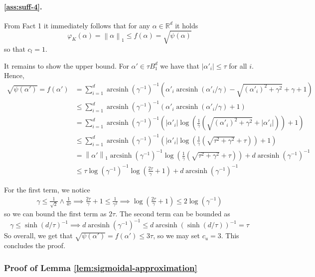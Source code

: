 \documentclass[a4paper]{article}
\newcommand{\pr}[1]{\left(#1\right)}
\newcommand{\abs}[1]{\left\lvert#1\right\rvert}
\newcommand{\norm}[1]{\left\|#1\right\|}
\newcommand{\RR}[0]{\mathbb{R}}
\DeclareMathOperator{\arcsinh}{arcsinh}
\theoremstyle{thmstyle}
\theoremstyle{defstyle}
\theoremstyle{remark}
\begin{document}
\paragraph{\ref{ass:suff-4}.}
From Fact 1 it immediately follows that for any $\alpha\in\RR^d$ it holds
\begin{equation*}
    \varphi_K(\alpha)=\norm{\alpha}_1 \leq f(\alpha)=\sqrt{\psi(\alpha)}
\end{equation*}
so that $c_l=1$.

It remains to show the upper bound. For $\alpha'\in \tau B_1^d$ we have that $\abs{\alpha'_i}\leq \tau$ for all $i$. Hence,
\begin{align*}
    \sqrt{\psi(\alpha')}=f(\alpha')&=\sum_{i=1}^d \arcsinh\pr{\gamma^{-1}}^{-1}\pr{ \alpha'_i\arcsinh\pr{\alpha'_i/\gamma}-\sqrt{(\alpha'_i)^2+\gamma^2}+\gamma+1} \\
    &\leq \sum_{i=1}^d \arcsinh\pr{\gamma^{-1}}^{-1}\pr{ \alpha'_i\arcsinh\pr{\alpha'_i/\gamma}+1}\\
    &=\sum_{i=1}^d \arcsinh\pr{\gamma^{-1}}^{-1}\pr{ \abs{\alpha'_i}\log\pr{\frac{1}{\gamma}\pr{\sqrt{(\alpha'_i)^2+\gamma^2}+\abs{\alpha'_i}}}+1} \\
    &\leq \sum_{i=1}^d \arcsinh\pr{\gamma^{-1}}^{-1}\pr{ \abs{\alpha'_i}\log\pr{\frac{1}{\gamma}\pr{\sqrt{\tau^2+\gamma^2}+\tau}}+1} \\
    &= \norm{\alpha'}_1 \arcsinh\pr{\gamma^{-1}}^{-1}\log\pr{\frac{1}{\gamma}\pr{\sqrt{\tau^2+\gamma^2}+\tau}}+d\arcsinh\pr{\gamma^{-1}}^{-1} \\
    &\leq \tau \log\pr{\gamma^{-1}}^{-1}\log\pr{\frac{2\tau}{\gamma}+1}+d\arcsinh\pr{\gamma^{-1}}^{-1}
\end{align*}

For the first term, we notice
\begin{align*}
    \gamma\leq \frac{1}{\sqrt{2}}\wedge\frac{1}{4\tau}\implies \frac{2\tau}{\gamma}+1\leq \frac{1}{\gamma^2} \implies \log\pr{\frac{2\tau}{\gamma}+1} \leq 2\log(\gamma^{-1})  
\end{align*}
so we can bound the first term as $2\tau$. The second term can be bounded as
\begin{equation*}
    \gamma \leq \sinh(d/\tau)^{-1}\implies d\arcsinh(\gamma^{-1})^{-1}\leq d\arcsinh(\sinh(d/\tau))^{-1}=\tau
\end{equation*}
So overall, we get that $\sqrt{\psi(\alpha')}=f(\alpha')\leq 3\tau$, so we may set $c_u=3$.
This concludes the proof.

\subsubsection{Proof of Lemma \ref{lem:sigmoidal-approximation}}
\end{document}
